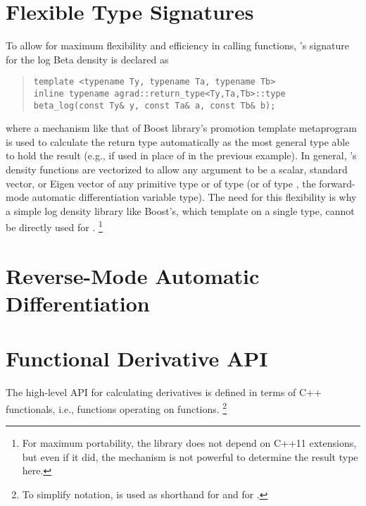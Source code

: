\documentclass[10pt]{article}
\begin{document}
\section{Flexible Type Signatures}\label{flexible-signatures.section}

To allow for maximum flexibility and efficiency in calling functions, 
's signature for the log Beta density is declared as
%
\begin{quote}
\begin{Verbatim}
template <typename Ty, typename Ta, typename Tb>
inline typename agrad::return_type<Ty,Ta,Tb>::type
beta_log(const Ty& y, const Ta& a, const Tb& b); 
\end{Verbatim}
\end{quote}
%
where a mechanism like that of Boost library's promotion template
metaprogram is used to calculate the return type automatically as the
most general type able to hold the result (e.g.,  if
used in place of  in the previous example). In general,
's density functions are vectorized to allow any argument
to be a scalar, standard vector, or Eigen vector of any primitive type
or of type  (or of type , the forward-mode
automatic differentiation variable type).  The need for this
flexibility is why a simple log density library like Boost's, which
template on a single type, cannot be directly used for .
%
\footnote{For maximum portability, the  library does not
  depend on C++11 extensions, but even if it did, the 
  mechanism is not powerful to determine the result type here.}





\section{Reverse-Mode Automatic Differentiation}


\appendix

\section{Functional Derivative API}

The high-level  API for calculating derivatives is defined
in terms of C++ functionals, i.e., functions operating on functions.%
%
\footnote{To simplify notation,  is used as shorthand
for  and 
 for .}
\end{document}
